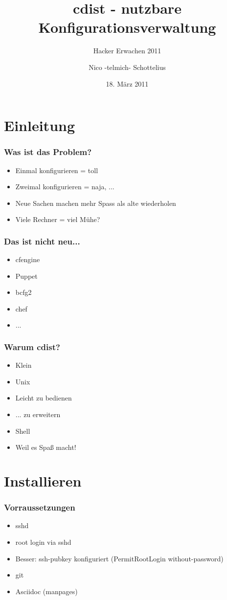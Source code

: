 \documentclass{beamer}
\title{cdist - nutzbare Konfigurationsverwaltung}
\subtitle{Hacker Erwachen 2011}
\author{Nico -telmich- Schottelius}
\date{18. März 2011}
\begin{document}
\frame{\titlepage}

\frame{\tableofcontents}

\section{Einleitung}
\frame
{
  \frametitle{Was ist das Problem?}
  \begin{itemize}[<+->]
  \item Einmal konfigurieren = toll
  \item Zweimal konfigurieren = naja, ...
  \item Neue Sachen machen mehr Spass als alte wiederholen
  \item Viele Rechner = viel Mühe?
  \end{itemize}
}

\frame
{
  \frametitle{Das ist nicht neu...}
  \begin{itemize}[<+->]
  \item cfengine
  \item Puppet
  \item bcfg2
  \item chef
  \item ...
  \end{itemize}
}

\frame
{
  \frametitle{Warum cdist?}
  \begin{itemize}[<+->]
     \item Klein
     \item Unix
     \item Leicht zu bedienen
     \item ... zu erweitern
     \item Shell
     \item Weil es Spaß macht!
  \end{itemize}
}

\section{Installieren}
\frame
{
  \frametitle{Vorraussetzungen}
  \begin{itemize}[<+->]
     \item sshd
     \item root login via sshd
     \item Besser: ssh-pubkey konfiguriert (PermitRootLogin without-password)
     \item git
     \item Asciidoc (manpages)
  \end{itemize}
}
\end{document}
